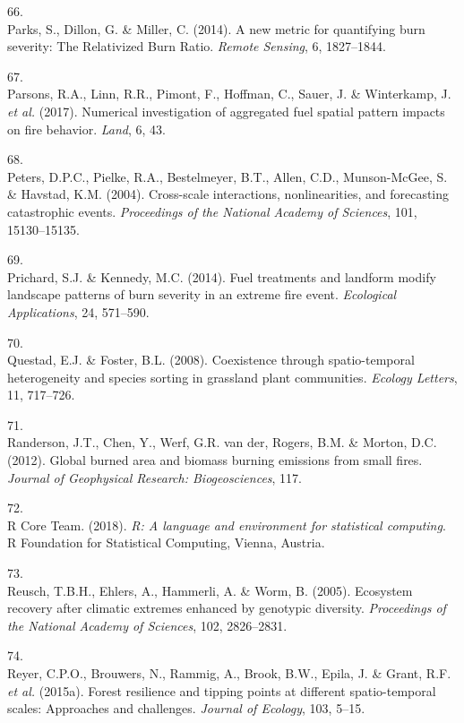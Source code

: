 \documentclass[]{article}
\begin{document}
\leavevmode\hypertarget{ref-parks2014a}{}%
66.\\
Parks, S., Dillon, G. \& Miller, C. (2014). A new metric for quantifying
burn severity: The Relativized Burn Ratio. \emph{Remote Sensing}, 6,
1827--1844.

\leavevmode\hypertarget{ref-parsons2017}{}%
67.\\
Parsons, R.A., Linn, R.R., Pimont, F., Hoffman, C., Sauer, J. \&
Winterkamp, J. \emph{et al.} (2017). Numerical investigation of
aggregated fuel spatial pattern impacts on fire behavior. \emph{Land},
6, 43.

\leavevmode\hypertarget{ref-peters2004}{}%
68.\\
Peters, D.P.C., Pielke, R.A., Bestelmeyer, B.T., Allen, C.D.,
Munson-McGee, S. \& Havstad, K.M. (2004). Cross-scale interactions,
nonlinearities, and forecasting catastrophic events. \emph{Proceedings
of the National Academy of Sciences}, 101, 15130--15135.

\leavevmode\hypertarget{ref-prichard2014}{}%
69.\\
Prichard, S.J. \& Kennedy, M.C. (2014). Fuel treatments and landform
modify landscape patterns of burn severity in an extreme fire event.
\emph{Ecological Applications}, 24, 571--590.

\leavevmode\hypertarget{ref-questad2008}{}%
70.\\
Questad, E.J. \& Foster, B.L. (2008). Coexistence through
spatio-temporal heterogeneity and species sorting in grassland plant
communities. \emph{Ecology Letters}, 11, 717--726.

\leavevmode\hypertarget{ref-randerson2012}{}%
71.\\
Randerson, J.T., Chen, Y., Werf, G.R. van der, Rogers, B.M. \& Morton,
D.C. (2012). Global burned area and biomass burning emissions from small
fires. \emph{Journal of Geophysical Research: Biogeosciences}, 117.

\leavevmode\hypertarget{ref-rcoreteam2018}{}%
72.\\
R Core Team. (2018). \emph{R: A language and environment for statistical
computing}. R Foundation for Statistical Computing, Vienna, Austria.

\leavevmode\hypertarget{ref-reusch2005}{}%
73.\\
Reusch, T.B.H., Ehlers, A., Hammerli, A. \& Worm, B. (2005). Ecosystem
recovery after climatic extremes enhanced by genotypic diversity.
\emph{Proceedings of the National Academy of Sciences}, 102, 2826--2831.

\leavevmode\hypertarget{ref-reyer2015a}{}%
74.\\
Reyer, C.P.O., Brouwers, N., Rammig, A., Brook, B.W., Epila, J. \&
Grant, R.F. \emph{et al.} (2015a). Forest resilience and tipping points
at different spatio-temporal scales: Approaches and challenges.
\emph{Journal of Ecology}, 103, 5--15.
\end{document}
